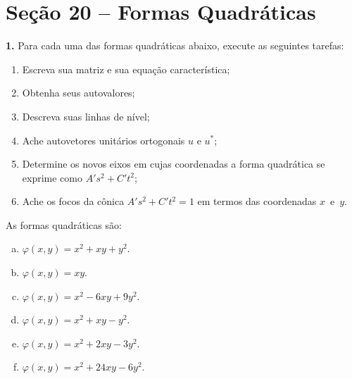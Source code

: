 \documentclass[a4paper,11pt]{article}
\begin{document}
\section*{Seção 20 -- Formas Quadráticas}

\textbf{1.}
Para cada uma das formas quadráticas abaixo, execute as seguintes tarefas:
\begin{enumerate}
  \item
    Escreva sua matriz e sua equação característica;
  \item
    Obtenha seus autovalores;
  \item
    Descreva suas linhas de nível;
  \item
    Ache autovetores unitários ortogonais $u$ e $u^*$;
  \item
    Determine os novos eixos em cujas coordenadas a forma quadrática se exprime como $A' s^2 + C' t^2$;
  \item
    Ache os focos da cônica $A' s^2 + C' t^2 = 1$ em termos das coordenadas $x$~e~$y$.
\end{enumerate}
As formas quadráticas são:
\begin{enumerate}[(a)]
  \item
    $\varphi(x,y) = x^2 + xy + y^2$.
  \item
    $\varphi(x,y) = xy$.
  \item
    $\varphi(x,y) = x^2 -6 xy +9 y^2$.
  \item
    $\varphi(x,y) = x^2 + xy - y^2$.
  \item
    $\varphi(x,y) = x^2 +2 xy -3 y^2$.
  \item
    $\varphi(x,y) = x^2 +24 xy -6 y^2$.
\end{enumerate}

\vspace{\baselineskip}
\end{document}
